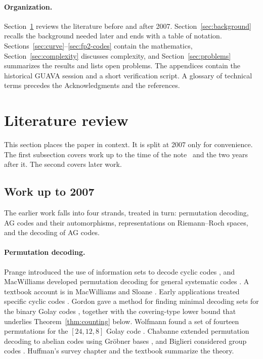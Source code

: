 \documentclass[12pt,letterpaper]{article}
\theoremstyle{definition}
\theoremstyle{remark}
\numberwithin{equation}{section}
\begin{document}
\paragraph{Organization.}
Section~\ref{sec:lit} reviews the literature before and after 2007.
Section~\ref{sec:background} recalls the background needed later and ends
with a table of notation.
Sections~\ref{sec:curve}--\ref{sec:fp2-codes} contain the mathematics,
Section~\ref{sec:complexity} discusses complexity, and
Section~\ref{sec:problems} summarizes the results and lists open problems.
The appendices contain
the historical GUAVA session and a short verification script.  A glossary
of technical terms precedes the Acknowledgments and the references.

\section{Literature review}\label{sec:lit}

This section places the paper in context. It is split at 2007 only for
convenience. The first subsection covers work up to the time of the
note~\cite{Jo05} and the two years after it. The second covers later
work.

\subsection{Work up to 2007}

The earlier work falls into four strands, treated in turn: permutation
decoding, AG codes and their automorphisms, representations on
Riemann--Roch spaces, and the decoding of AG codes.

\paragraph{Permutation decoding.}
Prange introduced the use of information sets to decode cyclic codes
\cite{Pr62}, and MacWilliams developed permutation decoding for general
systematic codes \cite{Mac64}.  A textbook account is in MacWilliams and
Sloane \cite[Ch.~16]{MS77}.  Early applications treated specific cyclic
codes \cite{SFT70,SF72}.  Gordon gave a method for finding minimal
decoding sets for the binary Golay codes \cite{Gor82}, together with the
covering-type lower bound that underlies Theorem~\ref{thm:counting}
below.  Wolfmann found a set of fourteen permutations for the
$[24,12,8]$ Golay code \cite{Wo83}.  Chabanne extended permutation
decoding to abelian codes using Gr\"obner bases \cite{Ch92}, and Biglieri
considered group codes \cite{Bi95}.  Huffman's survey chapter \cite{Hu98}
and the textbook \cite{HP03} summarize the theory.
\end{document}
